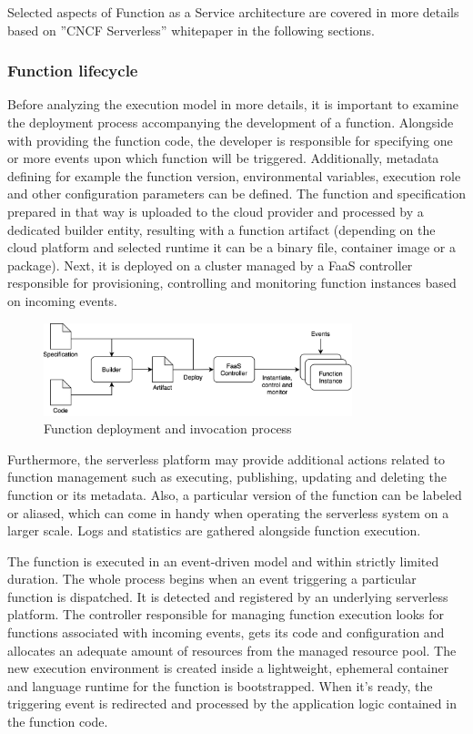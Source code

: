 Selected aspects of Function as a Service architecture are covered in more details based on ''CNCF Serverless'' whitepaper \cite{CNCFServerless} in the following sections.

\subsubsection*{Function lifecycle}

Before analyzing the execution model in more details, it is important to examine the deployment process accompanying the development of a function. Alongside with providing the function code, the developer is responsible for specifying one or more events upon which function will be triggered. Additionally, metadata defining for example the function version, environmental variables, execution role and other configuration parameters can be defined. The function and specification prepared in that way is uploaded to the cloud provider and processed by a dedicated builder entity, resulting with a function artifact (depending on the cloud platform and selected runtime it can be a binary file, container image or a package). Next, it is deployed on a cluster managed by a FaaS controller responsible for provisioning, controlling and monitoring function instances based on incoming events.

\begin{figure}[h]
    \centering
    \includegraphics[width=0.8\textwidth]{assets/02-serverless/ServerlessDeployment.png}
    \caption{Function deployment and invocation process}
    \label{fig:function-deployment-and-invocation-process}
\end{figure}

Furthermore, the serverless platform may provide additional actions related to function management such as executing, publishing, updating and deleting the function or its metadata. Also, a particular version of the function can be labeled or aliased, which can come in handy when operating the serverless system on a larger scale. Logs and statistics are gathered alongside function execution.

The function is executed in an event-driven model and within strictly limited duration. The whole process begins when an event triggering a particular function is dispatched. It is detected and registered by an underlying serverless platform. The controller responsible for managing function execution looks for functions associated with incoming events, gets its code and configuration and allocates an adequate amount of resources from the managed resource pool. The new execution environment is created inside a lightweight, ephemeral container and language runtime for the function is bootstrapped. When it's ready, the triggering event is redirected and processed by the application logic contained in the function code.

